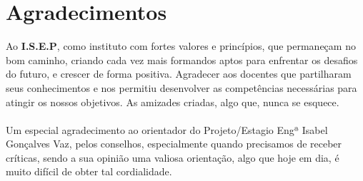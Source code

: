 \cleardoublepage
\chapter*{Agradecimentos}
\label{Agradecimentos}
Ao \textbf{I.S.E.P}, como instituto com fortes valores e princípios, que permaneçam no bom caminho, criando cada vez mais formandos aptos para enfrentar os desafios do futuro, e crescer de forma positiva. Agradecer aos docentes que partilharam seus conhecimentos e nos permitiu desenvolver as competências necessárias para atingir os nossos objetivos. As amizades criadas, algo que, nunca se esquece.\\
\\
Um especial agradecimento ao orientador do Projeto/Estagio Engª Isabel Gonçalves Vaz, pelos conselhos, especialmente quando precisamos de receber críticas, sendo a sua opinião uma valiosa orientação, algo que hoje em dia, é muito difícil de obter tal cordialidade.
